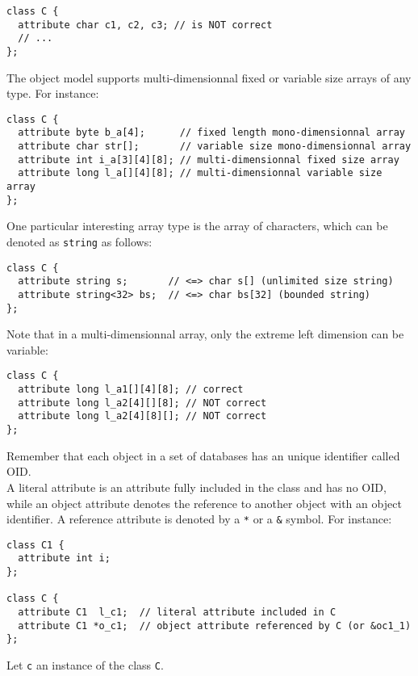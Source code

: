 \vspace{-0.2cm}
\begin{verbatim}
class C {
  attribute char c1, c2, c3; // is NOT correct
  // ...
};
\end{verbatim}
\ee
{}
The object model supports multi-dimensionnal fixed or variable size arrays
of any type. For instance:
\vspace{-0.2cm}
\begin{verbatim}
class C {
  attribute byte b_a[4];      // fixed length mono-dimensionnal array
  attribute char str[];       // variable size mono-dimensionnal array
  attribute int i_a[3][4][8]; // multi-dimensionnal fixed size array
  attribute long l_a[][4][8]; // multi-dimensionnal variable size array
};
\end{verbatim}
One particular interesting array type is the array of characters, which
can be denoted as \texttt{string} as follows:
\vspace{-0.2cm}
\begin{verbatim}
class C {
  attribute string s;       // <=> char s[] (unlimited size string)
  attribute string<32> bs;  // <=> char bs[32] (bounded string)
};
\end{verbatim}
Note that in a multi-dimensionnal array, only the extreme left dimension can be
variable:
\vspace{-0.2cm}
\begin{verbatim}
class C {
  attribute long l_a1[][4][8]; // correct
  attribute long l_a2[4][][8]; // NOT correct
  attribute long l_a2[4][8][]; // NOT correct
};
\end{verbatim}
Remember that each object in a set of \eyedb databases has an unique identifier called OID.
\\
A literal attribute is an attribute fully included in the class and has
no OID, while an object attribute denotes the reference
to another object with an object identifier.
A reference attribute is denoted by a \texttt{*} or a \texttt{\&} symbol.
For instance:
\vspace{-0.2cm}
\begin{verbatim}
class C1 {
  attribute int i;
};

class C {
  attribute C1  l_c1;  // literal attribute included in C
  attribute C1 *o_c1;  // object attribute referenced by C (or &oc1_1)
};
\end{verbatim}
Let \texttt{c} an instance of the class \texttt{C}.

